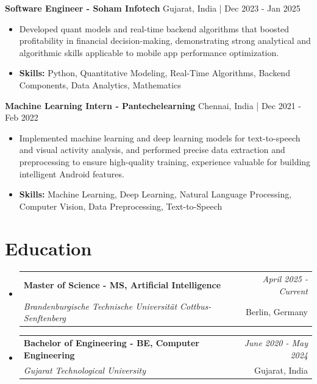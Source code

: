 \documentclass[a4paper,11pt]{article}
\makeatletter
\newcommand{\resumeSubheading}[4]{
\vspace{0.5mm}\item
    \begin{tabular*}{0.98\textwidth}[t]{l@{\extracolsep{\fill}}r}
        \textbf{#1} & \textit{\footnotesize{#4}} \\
        \textit{\footnotesize{#3}} &  \footnotesize{#2}\\
    \end{tabular*}
    \vspace{-2.4mm}
}
\makeatother
\begin{document}
\vspace{1mm}
  \textbf{Software Engineer - Soham Infotech} \hfill Gujarat, India | Dec 2023 - Jan 2025
\vspace{-1.5mm} %
\begin{itemize}
  \item Developed quant models and real-time backend algorithms that boosted profitability in financial decision-making, demonstrating strong analytical and algorithmic skills applicable to mobile app performance optimization.

\vspace{-2mm}
  \item \textbf{Skills:} Python, Quantitative Modeling, Real-Time Algorithms, Backend Components, Data Analytics, Mathematics
\end{itemize}

\vspace{1mm}
  \textbf{Machine Learning Intern - Pantechelearning} \hfill Chennai, India | Dec 2021 - Feb 2022
\vspace{-1.5mm} %
\begin{itemize}
  \item Implemented machine learning and deep learning models for text-to-speech and visual activity analysis, and performed precise data extraction and preprocessing to ensure high-quality training, experience valuable for building intelligent Android features.
\vspace{-2mm}
  \item \textbf{Skills:} Machine Learning, Deep Learning, Natural Language Processing, Computer Vision, Data Preprocessing, Text-to-Speech
\end{itemize}\section{\textbf{Education}}
\vspace{-0.4mm}

\begin{itemize}
\resumeSubheading
{Master of Science - MS, Artificial Intelligence }{Berlin, Germany}
{Brandenburgische Technische Universität Cottbus-Senftenberg  }{April 2025 - Current}

\vspace{1.0mm} %
\resumeSubheading
{Bachelor of Engineering - BE, Computer Engineering  }{Gujarat, India}
{Gujarat Technological University }{June 2020 - May 2024}

\end{itemize}
\end{document}
